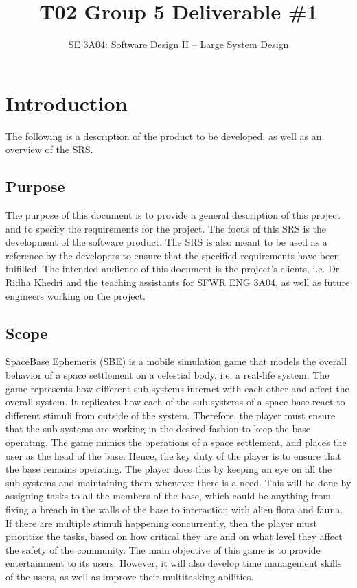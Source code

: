 \documentclass[]{article}
\title{T02 Group 5 Deliverable \#1}
\author{SE 3A04: Software Design II -- Large System Design}
\begin{document}
\maketitle	

\section{Introduction}
\label{sec:introduction}

The following is a description of the product to be developed, as well as an overview of the SRS.

\subsection{Purpose}
\label{sub:purpose}
	The purpose of this document is to provide a general description of this project and to specify the requirements for the project. The focus of this SRS is the development of the software product. The SRS is also meant to be used as a reference by the developers to ensure that the specified requirements have been fulfilled. The intended audience of this document is the project's clients, i.e. Dr. Ridha Khedri and the teaching assistants for SFWR ENG 3A04, as well as future engineers working on the project.

\subsection{Scope}
\label{sub:scope}
	SpaceBase Ephemeris (SBE) is a mobile simulation game that models the overall behavior of a space settlement on a celestial body, i.e. a real-life system. The game represents how different sub-systems interact with each other and affect the overall system. It replicates how each of the sub-systems of a space base react to different stimuli from outside of the system. Therefore, the player must ensure that the sub-systems are working in the desired fashion to keep the base operating. The game mimics the operations of a space settlement, and places the user as the head of the base. Hence, the key duty of the player is to ensure that the base remains operating. The player does this by keeping an eye on all the sub-systems and maintaining them whenever there is a need. This will be done by assigning tasks to all the members of the base, which could be anything from fixing a breach in the walls of the base to interaction with alien flora and fauna. If there are multiple stimuli happening concurrently, then the player must prioritize the tasks, based on how critical they are and on what level they affect the safety of the community. The main objective of this game is to provide entertainment to its users. However, it will also develop time management skills of the users, as well as improve their multitasking abilities. 
\end{document}
